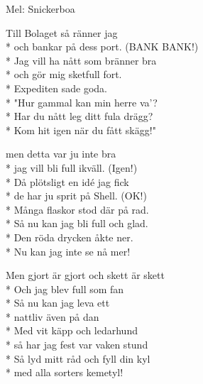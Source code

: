 \begin{SongText}[Bolaget]
    \begin{SongInfo}
        Mel: Snickerboa
    \end{SongInfo}
    \begin{SongVerse}
        Till Bolaget så ränner jag\\*%
        och bankar på dess port. (BANK BANK!)\\*%
        Jag vill ha nått som bränner bra\\*%
        och gör mig sketfull fort.\\*%
        Expediten sade goda.\\*%
        "Hur gammal kan min herre va'?\\*%
        Har du nått leg ditt fula drägg?\\*%
        Kom hit igen när du fått skägg!"
    \end{SongVerse}
    \begin{SongVerse}
        men detta var ju inte bra\\*%
        jag vill bli full ikväll. (Igen!)\\*%
        Då plötsligt en idé jag fick\\*%
        de har ju sprit på Shell. (OK!)\\*%
        Många flaskor stod där på rad.\\*%
        Så nu kan jag bli full och glad.\\*%
        Den röda drycken åkte ner.\\*%
        Nu kan jag inte se nå mer!
    \end{SongVerse}
    \begin{SongVerse}
        Men gjort är gjort och skett är skett\\*%
        Och jag blev full som fan\\*%
        Så nu kan jag leva ett\\*%
        nattliv även på dan\\*%
        Med vit käpp och ledarhund\\*%
        så har jag fest var vaken stund\\*%
        Så lyd mitt råd och fyll din kyl\\*%
        med alla sorters kemetyl!
    \end{SongVerse}
\end{SongText}
